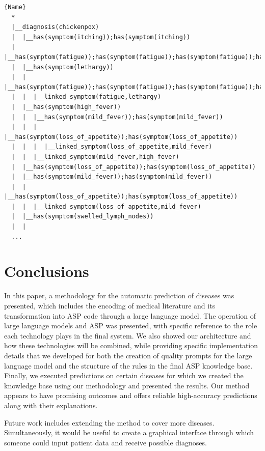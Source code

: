 \documentclass[10pt,leqno]{amsart}
\begin{document}
\begin{lstlisting}[caption={Part of the explanation for the diagnosis of the
disease chickenpox. The decision tree diagram shows the associations between
different symptoms and how our system arrives at its conclusions.},
label=lst:terms]{Name}
  *
  |__diagnosis(chickenpox)
  |  |__has(symptom(itching));has(symptom(itching))
  |  |__has(symptom(fatigue));has(symptom(fatigue));has(symptom(fatigue));has(symptom(fatigue));has(symptom(fatigue))
  |  |__has(symptom(lethargy))
  |  |  |__has(symptom(fatigue));has(symptom(fatigue));has(symptom(fatigue));has(symptom(fatigue));has(symptom(fatigue))
  |  |  |__linked_symptom(fatigue,lethargy)
  |  |__has(symptom(high_fever))
  |  |  |__has(symptom(mild_fever));has(symptom(mild_fever))
  |  |  |  |__has(symptom(loss_of_appetite));has(symptom(loss_of_appetite))
  |  |  |  |__linked_symptom(loss_of_appetite,mild_fever)
  |  |  |__linked_symptom(mild_fever,high_fever)
  |  |__has(symptom(loss_of_appetite));has(symptom(loss_of_appetite))
  |  |__has(symptom(mild_fever));has(symptom(mild_fever))
  |  |  |__has(symptom(loss_of_appetite));has(symptom(loss_of_appetite))
  |  |  |__linked_symptom(loss_of_appetite,mild_fever)
  |  |__has(symptom(swelled_lymph_nodes))
  |  |  
  ...
\end{lstlisting}

\section{Conclusions}

In this paper, a methodology for the automatic prediction of diseases was
presented, which includes the encoding of medical literature and its
transformation into ASP code through a large language model. The operation of
large language models and ASP was presented, with specific reference to the
role each technology plays in the final system. We also showed our architecture
and how these technologies will be combined, while providing specific
implementation details that we developed for both the creation of quality
prompts for the large language model and the structure of the rules in the
final ASP knowledge base. Finally, we executed predictions on certain diseases
for which we created the knowledge base using our methodology and presented the
results. Our method appears to have promising outcomes and offers reliable
high-accuracy predictions along with their explanations.

Future work includes extending the method to cover more diseases.
Simultaneously, it would be useful to create a graphical interface through
which someone could input patient data and receive possible diagnoses.
\newpage


\end{document}
